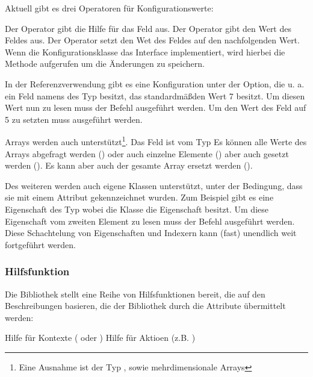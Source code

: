Aktuell gibt es drei Operatoren für Konfigurationswerte:
\begin{outline}
 \1 Der  Operator gibt die Hilfe für das Feld aus.
 \1 Der  Operator gibt den Wert des Feldes aus.
 \1 Der  Operator setzt den Wet des Feldes auf den nachfolgenden Wert.
 Wenn die Konfigurationsklasse das  Interface implementiert, wird hierbei die  Methode aufgerufen um die \"Anderungen zu speichern.
 \end{outline}

In der Referenzverwendung gibt es eine Konfiguration unter der  Option, die u. a. ein Feld namens  des Typ  besitzt, das standardmä\ss den Wert 7 besitzt.
Um diesen Wert nun zu lesen muss der Befehl  ausgeführt werden.
Um den Wert des Feld auf 5 zu setzten muss  ausgeführt werden.

Arrays werden auch unterstützt\footnote{Eine Ausnahme ist der Typ , sowie mehrdimensionale Arrays}.
Das Feld  ist vom Typ 
Es können alle Werte des Arrays abgefragt werden ()
oder auch einzelne Elemente () aber auch gesetzt werden ().
Es kann aber auch der gesamte Array ersetzt werden ().

Des weiteren werden auch eigene Klassen unterstützt, unter der Bedingung, dass sie mit einem  Attribut gekennzeichnet wurden.
Zum Beispiel gibt es eine Eigenschaft des Typ  wobei die Klasse  die Eigenschaft  besitzt.
Um diese Eigenschaft vom zweiten Element zu lesen muss der Befehl  ausgeführt werden.
Diese Schachtelung von Eigenschaften und Indexern kann (fast) unendlich weit fortgeführt werden.
\subsubsection{Hilfsfunktion}
Die Bibliothek stellt eine Reihe von Hilfsfunktionen bereit, die auf den Beschreibungen basieren, die der Bibliothek durch die Attribute übermittelt werden:
\begin{outline}
 \1 Hilfe für Kontexte ( oder )
 \1 Hilfe für Aktioen (z.B. )
\end{outline}

